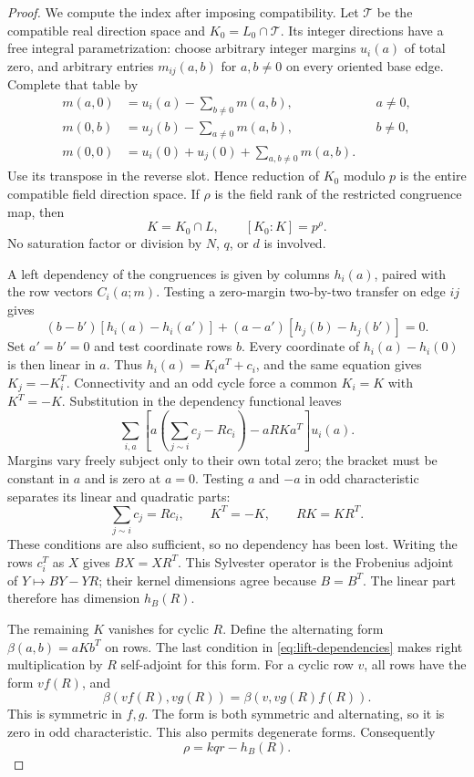 \begin{proof}
We compute the index after imposing compatibility. Let $\mathcal T$
be the compatible real direction space and $K_0=L_0\cap\mathcal T$.
Its integer directions have a free integral parametrization: choose
arbitrary integer margins $u_i(a)$ of total zero, and arbitrary
entries $m_{ij}(a,b)$ for $a,b\ne0$ on every oriented base edge.
Complete that table by
\begin{align*}
 m(a,0)&=u_i(a)-\sum_{b\ne0}m(a,b),&&a\ne0,\\
 m(0,b)&=u_j(b)-\sum_{a\ne0}m(a,b),&&b\ne0,\\
 m(0,0)&=u_i(0)+u_j(0)+\sum_{a,b\ne0}m(a,b).
\end{align*}
Use its transpose in the reverse slot. Hence reduction of $K_0$
modulo $p$ is the entire compatible field direction space.
If $\rho$ is the field rank of the restricted congruence map, then
\begin{equation}\label{eq:lift-compatible-index}
 K=K_0\cap L,\qquad [K_0:K]=p^\rho.
\end{equation}
No saturation factor or division by $N$, $q$, or $d$ is involved.

A left dependency of the congruences is given by columns $h_i(a)$,
paired with the row vectors $C_i(a;m)$. Testing a zero-margin
two-by-two transfer on edge $ij$ gives
\[
 (b-b')[h_i(a)-h_i(a')]
 +(a-a')[h_j(b)-h_j(b')]=0.
\]
Set $a'=b'=0$ and test coordinate rows $b$. Every coordinate of
$h_i(a)-h_i(0)$ is then linear in $a$. Thus
$h_i(a)=K_i a^T+c_i$, and the same equation gives
$K_j=-K_i^T$. Connectivity and an odd cycle force a common
$K_i=K$ with $K^T=-K$. Substitution in the dependency functional
leaves
\[
 \sum_{i,a}\left[a\left(\sum_{j\sim i}c_j-Rc_i\right)
                         -aRK a^T\right]u_i(a).
\]
Margins vary freely subject only to their own total zero; the bracket
must be constant in $a$ and is zero at $a=0$. Testing $a$ and $-a$
in odd characteristic separates its linear and quadratic parts:
\begin{equation}\label{eq:lift-dependencies}
 \sum_{j\sim i}c_j=Rc_i,\qquad K^T=-K,\qquad RK=KR^T.
\end{equation}
These conditions are also sufficient, so no dependency has been lost.
Writing the rows $c_i^T$ as $X$ gives $BX=XR^T$.
This Sylvester operator is the Frobenius adjoint of $Y\mapsto BY-YR$;
their kernel dimensions agree because $B=B^T$. The linear part
therefore has dimension $h_B(R)$.

The remaining $K$ vanishes for cyclic $R$. Define the alternating
form $\beta(a,b)=aKb^T$ on rows. The last condition in
\eqref{eq:lift-dependencies} makes right multiplication by $R$
self-adjoint for this form. For a cyclic row $v$, all rows have
the form $vf(R)$, and
\[
 \beta(vf(R),vg(R))=\beta(v,v g(R)f(R)).
\]
This is symmetric in $f,g$. The form is both symmetric and
alternating, so it is zero in odd characteristic. This also permits
degenerate forms. Consequently
\begin{equation}\label{eq:lift-compatible-rank}
 \rho=kqr-h_B(R).
\end{equation}


\end{proof}
